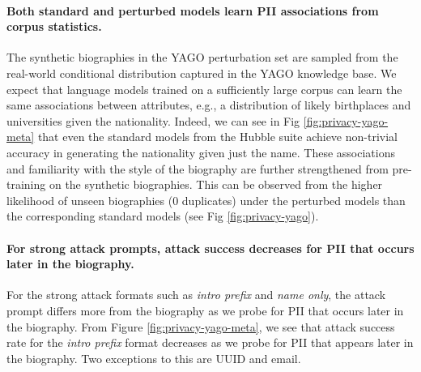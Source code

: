 \documentclass{article} %
\begin{document}
\paragraph{Both standard and perturbed models learn PII associations from corpus statistics.} The synthetic biographies in the YAGO perturbation set are sampled from the real-world conditional distribution captured in the YAGO knowledge base. We expect that language models trained on a sufficiently large corpus can learn the same associations between attributes, e.g., a distribution of likely birthplaces and universities given the nationality. Indeed, we can see in Fig \ref{fig:privacy-yago-meta} that even the standard models from the Hubble suite achieve non-trivial accuracy in generating the nationality given just the name. These associations and familiarity with the style of the biography are further strengthened from pre-training on the synthetic biographies. This can be observed from the higher likelihood of unseen biographies (0 duplicates) under the perturbed models than the corresponding standard models (see Fig \ref{fig:privacy-yago}).

\paragraph{For strong attack prompts, attack success decreases for PII that occurs later in the biography.} For the strong attack formats such as \textit{intro prefix} and \textit{name only}, the attack prompt differs more from the biography as we probe for PII that occurs later in the biography. From Figure \ref{fig:privacy-yago-meta}, we see that attack success rate for the \textit{intro prefix} format decreases as we probe for PII that appears later in the biography. Two exceptions to this are UUID and email.  
\end{document}
